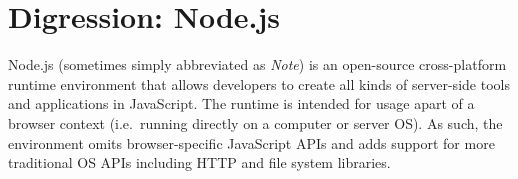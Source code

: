 \documentclass[a4paper, justified, notoc]{tufte-handout} %
\begin{document}
\newpage
\section{Digression: Node.js} %
\label{sec:node_js}

Node.js (sometimes simply abbreviated as \emph{Note}) is an open-source cross-platform runtime environment that allows developers to create all kinds of server-side tools and applications in JavaScript. The runtime is intended for usage apart of a browser context (i.e.\ running directly on a computer or server OS). As such, the environment omits browser-specific JavaScript APIs and adds support for more traditional OS APIs including HTTP and file system libraries.
\end{document}
